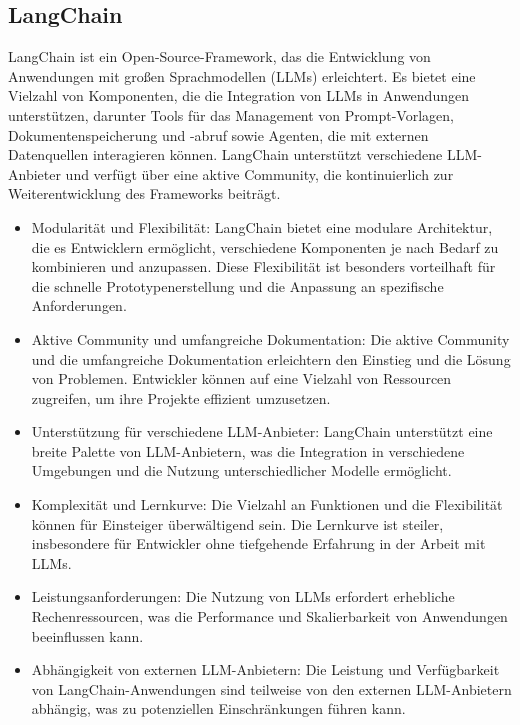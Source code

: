 \subsection{LangChain}\cite{phidata_vs_langchain_comparison}

LangChain ist ein Open-Source-Framework, das die Entwicklung von Anwendungen mit großen Sprachmodellen (LLMs) erleichtert. Es bietet eine Vielzahl von Komponenten, die die Integration von LLMs in Anwendungen unterstützen, darunter Tools für das Management von Prompt-Vorlagen, Dokumentenspeicherung und -abruf sowie Agenten, die mit externen Datenquellen interagieren können. LangChain unterstützt verschiedene LLM-Anbieter und verfügt über eine aktive Community, die kontinuierlich zur Weiterentwicklung des Frameworks beiträgt.

\begin{itemize}
    \item Modularität und Flexibilität: LangChain bietet eine modulare Architektur, die es Entwicklern ermöglicht, verschiedene Komponenten je nach Bedarf zu kombinieren und anzupassen. Diese Flexibilität ist besonders vorteilhaft für die schnelle Prototypenerstellung und die Anpassung an spezifische Anforderungen.

    \item Aktive Community und umfangreiche Dokumentation: Die aktive Community und die umfangreiche Dokumentation erleichtern den Einstieg und die Lösung von Problemen. Entwickler können auf eine Vielzahl von Ressourcen zugreifen, um ihre Projekte effizient umzusetzen.

    \item Unterstützung für verschiedene LLM-Anbieter: LangChain unterstützt eine breite Palette von LLM-Anbietern, was die Integration in verschiedene Umgebungen und die Nutzung unterschiedlicher Modelle ermöglicht.
\end{itemize}

\begin{itemize}
    \item Komplexität und Lernkurve: Die Vielzahl an Funktionen und die Flexibilität können für Einsteiger überwältigend sein. Die Lernkurve ist steiler, insbesondere für Entwickler ohne tiefgehende Erfahrung in der Arbeit mit LLMs.

    \item Leistungsanforderungen: Die Nutzung von LLMs erfordert erhebliche Rechenressourcen, was die Performance und Skalierbarkeit von Anwendungen beeinflussen kann.

    \item Abhängigkeit von externen LLM-Anbietern: Die Leistung und Verfügbarkeit von LangChain-Anwendungen sind teilweise von den externen LLM-Anbietern abhängig, was zu potenziellen Einschränkungen führen kann.
\end{itemize}

